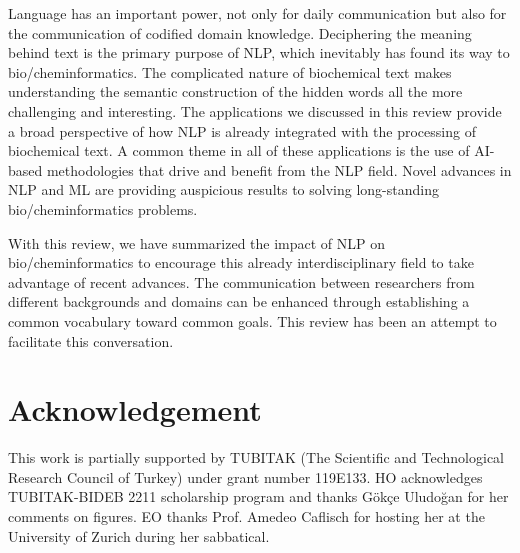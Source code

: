 \documentclass[review]{elsarticle}
\begin{document}
Language has an important power, not only for daily communication but also for the communication of codified domain knowledge. Deciphering the meaning behind text is the primary purpose of NLP, which inevitably has found its way to bio/cheminformatics. The complicated nature of  biochemical text makes understanding the semantic construction of the hidden words all the more challenging and interesting. The applications we discussed in this review provide a broad perspective of how NLP is already integrated with the processing of biochemical text. A common theme in all of these applications is the use of AI-based methodologies that drive and benefit from the NLP field. Novel advances in NLP and ML are providing auspicious results to solving long-standing bio/cheminformatics problems.  

With this review, we have summarized the impact of NLP on bio/cheminformatics to encourage this already interdisciplinary field to take advantage of recent advances. The communication between researchers from different backgrounds and domains can be enhanced through establishing a common vocabulary toward common goals. This review has been an attempt to facilitate this conversation.




\section*{Acknowledgement}
This work is partially supported by TUBITAK (The Scientific and Technological Research Council of Turkey) under grant number 119E133. HO acknowledges TUBITAK-BIDEB 2211 scholarship program and thanks G\"{o}k\c{c}e Uludo\u{g}an for her comments on figures. EO thanks Prof. Amedeo Caflisch for hosting her at the University of Zurich during her sabbatical.





\end{document}
